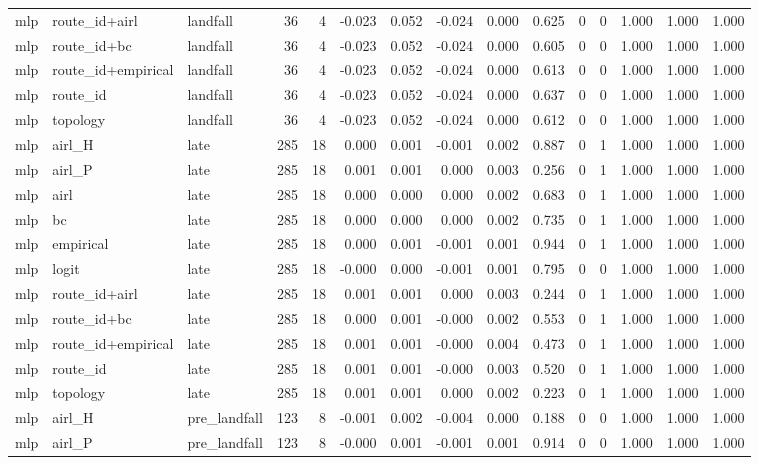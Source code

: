 \begin{tabular}{lllrrrrrrrrrrrr}
mlp & route_id+airl & landfall & 36 & 4 & -0.023 & 0.052 & -0.024 & 0.000 & 0.625 & 0 & 0 & 1.000 & 1.000 & 1.000 \\
mlp & route_id+bc & landfall & 36 & 4 & -0.023 & 0.052 & -0.024 & 0.000 & 0.605 & 0 & 0 & 1.000 & 1.000 & 1.000 \\
mlp & route_id+empirical & landfall & 36 & 4 & -0.023 & 0.052 & -0.024 & 0.000 & 0.613 & 0 & 0 & 1.000 & 1.000 & 1.000 \\
mlp & route_id & landfall & 36 & 4 & -0.023 & 0.052 & -0.024 & 0.000 & 0.637 & 0 & 0 & 1.000 & 1.000 & 1.000 \\
mlp & topology & landfall & 36 & 4 & -0.023 & 0.052 & -0.024 & 0.000 & 0.612 & 0 & 0 & 1.000 & 1.000 & 1.000 \\
mlp & airl_H & late & 285 & 18 & 0.000 & 0.001 & -0.001 & 0.002 & 0.887 & 0 & 1 & 1.000 & 1.000 & 1.000 \\
mlp & airl_P & late & 285 & 18 & 0.001 & 0.001 & 0.000 & 0.003 & 0.256 & 0 & 1 & 1.000 & 1.000 & 1.000 \\
mlp & airl & late & 285 & 18 & 0.000 & 0.000 & 0.000 & 0.002 & 0.683 & 0 & 1 & 1.000 & 1.000 & 1.000 \\
mlp & bc & late & 285 & 18 & 0.000 & 0.000 & 0.000 & 0.002 & 0.735 & 0 & 1 & 1.000 & 1.000 & 1.000 \\
mlp & empirical & late & 285 & 18 & 0.000 & 0.001 & -0.001 & 0.001 & 0.944 & 0 & 1 & 1.000 & 1.000 & 1.000 \\
mlp & logit & late & 285 & 18 & -0.000 & 0.000 & -0.001 & 0.001 & 0.795 & 0 & 0 & 1.000 & 1.000 & 1.000 \\
mlp & route_id+airl & late & 285 & 18 & 0.001 & 0.001 & 0.000 & 0.003 & 0.244 & 0 & 1 & 1.000 & 1.000 & 1.000 \\
mlp & route_id+bc & late & 285 & 18 & 0.000 & 0.001 & -0.000 & 0.002 & 0.553 & 0 & 1 & 1.000 & 1.000 & 1.000 \\
mlp & route_id+empirical & late & 285 & 18 & 0.001 & 0.001 & -0.000 & 0.004 & 0.473 & 0 & 1 & 1.000 & 1.000 & 1.000 \\
mlp & route_id & late & 285 & 18 & 0.001 & 0.001 & -0.000 & 0.003 & 0.520 & 0 & 1 & 1.000 & 1.000 & 1.000 \\
mlp & topology & late & 285 & 18 & 0.001 & 0.001 & 0.000 & 0.002 & 0.223 & 0 & 1 & 1.000 & 1.000 & 1.000 \\
mlp & airl_H & pre_landfall & 123 & 8 & -0.001 & 0.002 & -0.004 & 0.000 & 0.188 & 0 & 0 & 1.000 & 1.000 & 1.000 \\
mlp & airl_P & pre_landfall & 123 & 8 & -0.000 & 0.001 & -0.001 & 0.001 & 0.914 & 0 & 0 & 1.000 & 1.000 & 1.000 \\

\end{tabular}
